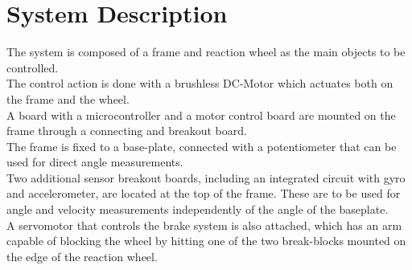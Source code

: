 \chapter{System Description}\label{systemDescription}
The system is composed of a frame and reaction wheel as the main objects to be controlled.\\
The control action is done with a brushless DC-Motor which actuates both on the frame and the wheel.\\ 
A board with a microcontroller and a motor control board are mounted on the frame through a connecting and breakout board.\\ 
The frame is fixed to a base-plate, connected with a potentiometer that can be used for direct angle measurements.\\ 
Two additional sensor breakout boards, including an integrated circuit with gyro and accelerometer, are located at the top of the frame. These are to be used for angle and velocity measurements independently of the angle of the baseplate.\\ 
A servomotor that controls the brake system is also attached, which has an arm capable of blocking the wheel by hitting one of the two break-blocks mounted on the edge of the reaction wheel.

